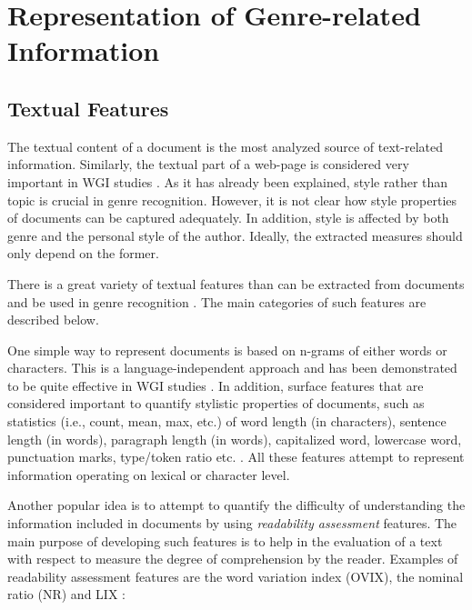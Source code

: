 \section{Representation of Genre-related Information}

\subsection{Textual Features}

The textual content of a document is the most analyzed source of text-related information. Similarly, the textual part of a web-page is considered very important in WGI studies \parencite{mason2009distance,Sharroff2010}. As it has already been explained, style rather than topic is crucial in genre recognition. However, it is not clear how style properties of documents can be captured adequately. In addition, style is affected by both genre and the personal style of the author. Ideally, the extracted measures should only depend on the former. 

There is a great variety of textual features than can be extracted from documents and be used in genre recognition \parencite{kanaris2009learning,kumari2014web,levering2008using,Lim2005,mason2009n,onan2018ensemble,petrenz2011stable,sharoff2010web,Nooralahzadeh2014}. The main categories of such features are described below.

One simple way to represent documents is based on n-grams of either words or characters. This is a language-independent approach and has been demonstrated to be quite effective in WGI studies . In addition, surface features that are considered important to quantify stylistic properties of documents, such as statistics (i.e., count, mean, max, etc.) of word length (in characters), sentence length (in words), paragraph length (in words), capitalized word, lowercase word, punctuation marks, type/token ratio etc. \parencite{feldman2009classifying,santini2005linguistic,onan2018ensemble}. All these features attempt to represent information operating on lexical or character level. 

Another popular idea is to attempt to quantify the difficulty of understanding the information included in documents by using \textit{readability assessment} features. The main purpose of developing such features is to help in the evaluation of a text with respect to measure the degree of comprehension by the reader. Examples of readability assessment features are the word variation index (OVIX), the nominal ratio (NR) and LIX \parencite{falkenjack2013features}:

